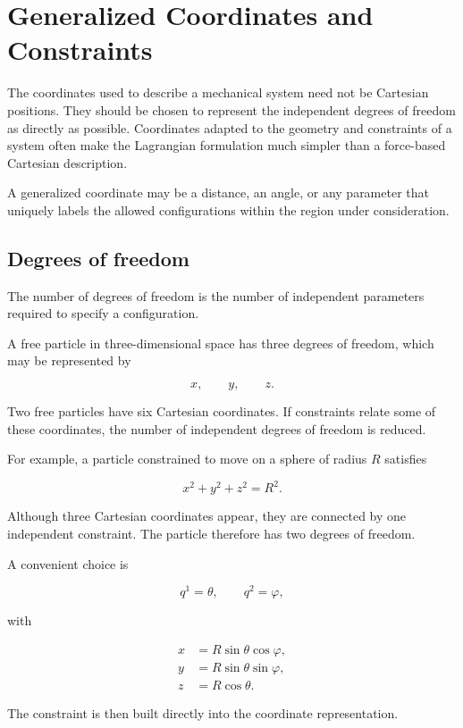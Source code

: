 \section{Generalized Coordinates and Constraints}
\label{sec:generalized_coordinates_constraints}

The coordinates used to describe a mechanical system need not be Cartesian positions. They should be chosen to represent the independent degrees of freedom as directly as possible. Coordinates adapted to the geometry and constraints of a system often make the Lagrangian formulation much simpler than a force-based Cartesian description.

A generalized coordinate may be a distance, an angle, or any parameter that uniquely labels the allowed configurations within the region under consideration.

\subsection{Degrees of freedom}

The number of degrees of freedom is the number of independent parameters required to specify a configuration.

A free particle in three-dimensional space has three degrees of freedom, which may be represented by

\[
x,
\qquad
y,
\qquad
z.
\]

Two free particles have six Cartesian coordinates. If constraints relate some of these coordinates, the number of independent degrees of freedom is reduced.

For example, a particle constrained to move on a sphere of radius \(R\) satisfies

\[
x^{2}+y^{2}+z^{2}=R^{2}.
\]

Although three Cartesian coordinates appear, they are connected by one independent constraint. The particle therefore has two degrees of freedom.

A convenient choice is

\[
q^{1}=\theta,
\qquad
q^{2}=\varphi,
\]

with

\[
\begin{aligned}
x&=R\sin\theta\cos\varphi,\\
y&=R\sin\theta\sin\varphi,\\
z&=R\cos\theta.
\end{aligned}
\]

The constraint is then built directly into the coordinate representation.

